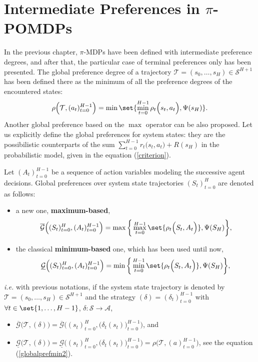 \section{Intermediate Preferences in $\pi$-POMDPs}
In the previous chapter, $\pi$-MDPs have been defined with intermediate preference degrees,
and after that, the particular case of terminal preferences only has been presented. 
The global preference degree of a trajectory $\mathcal{T} = (s_0,\ldots,s_{H}) \in \mathcal{S}^{H+1}$ 
has been defined there as the minimum of all the preference degrees of the encountered states:
\begin{equation}
\label{globalprefmin2}
 \rho\Big(\mathcal{T},(a_t)_{t=0}^{H-1}\Big) = \min \set{ \min_{t=0}^{H-1} \rho_t\Big(s_t,a_t\Big), \Psi(s_H) }. 
\end{equation}
Another global preference based on the $\max$ operator can be also proposed. 
Let us explicitly define the global preferences for system states:
they are the possibilistic counterparts 
of the sum $\sum_{t = 0}^{H-1} r_t\Big( s_t, a_t \Big) + R(s_H)$ 
in the probabilistic model, given in the equation (\ref{criterion}).  
\begin{Def}
\label{def_globaldef}
Let $(A_t)_{t=0}^{H-1}$ be a sequence of action variables modeling the successive agent decisions.
Global preferences over system state trajectories $(S_t)_{t=0}^{H}$ are denoted as follows:
\begin{itemize}
\item a new one, \textbf{maximum-based},
\begin{equation}
\label{globalprefmax}
\overline{\mathcal{G}} \Big( (S_t)_{t=0}^{H}, (A_t)_{t=0}^{H-1} \Big) = \max \bigg\{ \max_{t=0}^{H-1} \set{ \rho_t\Big( S_t, A_t \Big)  }, \Psi(S_H) \bigg\}, 
\end{equation}
\item the classical \textbf{minimum-based} one, which has been used until now,
\begin{equation}
\label{globalprefmin}
\underline{\mathcal{G}} \Big( (S_t)_{t=0}^{H}, (A_t)_{t=0}^{H-1} \Big) = \min \bigg\{ \min_{t=0}^{H-1} \set{ \rho_t\Big( S_t, A_t \Big)  }, \Psi(S_H) \bigg\},
\end{equation}
\end{itemize}
 \textit{i.e.} with previous notations, 
if the system state trajectory is denoted by $\mathcal{T} = (s_0,\ldots,s_{H}) \in \mathcal{S}^{H+1}$
and the strategy $(\delta) = (\delta_t)_{t=0}^{H-1}$ with $\forall t \in \set{1,\ldots,H-1}$, $\delta: \mathcal{S} \rightarrow \mathcal{A}$, 
\begin{itemize}
\item $\overline{\mathcal{G}} \Big( \mathcal{T}, (\delta) \Big) = \overline{\mathcal{G}} \bigg( (s_t)_{t=0}^{H}, \Big(\delta_t(s_t)\Big)_{t=0}^{H-1} \bigg)$, and
\item $\underline{\mathcal{G}} \Big( \mathcal{T}, (\delta) \Big) = \underline{\mathcal{G}} \bigg( (s_t)_{t=0}^{H}, \Big(\delta_t(s_t)\Big)_{t=0}^{H-1} \bigg) = \rho \Big( \mathcal{T},(a)_{t=0}^{H-1} \Big)$, see the equation (\ref{globalprefmin2}).
\end{itemize}
\end{Def}
